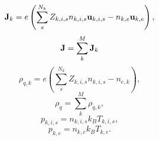 \documentclass[a4paper,11pt]{report}
\begin{document}
\begin{equation}
    \label{eq:mf_mm_curr_density}
    \mathbf{J}_k = e \left( \sum_s^{N_k} Z_{k,i,s} n_{k,i,s} \mathbf{u}_{k,i,s} - n_{k,e} \mathbf{u}_{k,e} \right),
\end{equation}
\begin{equation}
    \mathbf{J} = \sum_k^M \mathbf{J}_k
\end{equation}
\begin{equation}
    \label{eq:mf_mm_mass_density}
    \rho_{q,k} = e \left( \sum_s^{N_k} Z_{k,i,s} n_{k,i,s} - n_{e,k} \right),
\end{equation}
\begin{equation}
    \rho_q = \sum_k^M \rho_{q,k},
\end{equation}
\begin{equation}
    \label{eq:mf_mm_eos_ion}
    p_{k,i,s} = n_{k,i,s} k_B T_{k,i,s},
\end{equation}
\begin{equation}
    \label{eq:mf_mm_eos_elec}
    p_{k,e} = n_{k,e} k_B T_{k,e}.
\end{equation}

\end{document}
